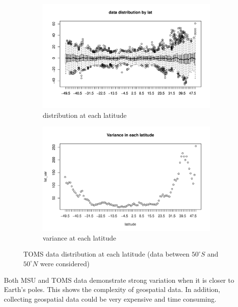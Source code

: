 \begin{figure}[H]
	\begin{subfigure}{.5\textwidth}
		\centering
		\includegraphics[width=1\linewidth]{graphs//TOMS_data_latitude}
		\caption{distribution at each latitude}
		\label{TOMS_data_latitude}
	\end{subfigure}
	\begin{subfigure}{.5\textwidth}
		\centering
		\includegraphics[width=1\linewidth]{graphs/TOMS_data_var_lat}
		\caption{variance at each latitude}
		\label{TOMS_data_var_lat}
	\end{subfigure}
	\caption[TOMS Data Distribution at Each Latitude (Data Between $50^\circ S$ and $50^\circ N$]{TOMS data distribution at each latitude (data between $50^\circ S$ and $50^\circ N$ were considered)}
	\label{compare_varigram_sim_2}
\end{figure}
\noi Both MSU and TOMS data demonstrate strong variation when it is closer to Earth's poles. This shows the complexity of geospatial data. In addition, collecting geospatial data could be very expensive and time consuming.


